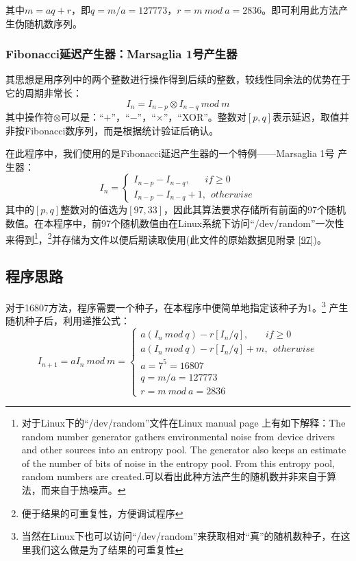 \documentclass[a4paper,11pt]{article}
\begin{document}
其中$m=aq+r$，即$q=m/a=127773$，$r=m \ mod \ a=2836$。即可利用此方法产生伪随机数序列。

\subsubsection{Fibonacci延迟产生器：Marsaglia 1号产生器}
其思想是用序列中的两个整数进行操作得到后续的整数，较线性同余法的优势在于它的周期非常长：
\begin{equation}
	I_{n}=I_{n-p} \otimes I_{n-q} \ mod \  m
\end{equation}
其中操作符$\otimes$可以是：“$+$”，“$-$”，“$\times$”，“XOR”。整数对$[p,q]$表示延迟，取值并非按Fibonacci数序列，而是根据统计验证后确认。

在此程序中，我们使用的是Fibonacci延迟产生器的一个特例——Marsaglia 1号 产生器：
\begin{equation}
	I_{n}=\left\{
	\begin{array}{l}
		I_{n-p} - I_{n-q},  \ \ \ \ \ \ \ if \geq 0 \\
		I_{n-p} - I_{n-q}+1, \ \ otherwise
	\end{array}
	\right.
\end{equation}
其中的$[p,q]$整数对的值选为$[97,33]$，因此其算法要求存储所有前面的97个随机数值。在本程序中，前97个随机数值由在Linux系统下访问“/dev/random”一次性来得到\footnote{对于Linux下的“/dev/random”文件在Linux manual page 上有如下解释：The random number generator gathers environmental noise from device
       drivers and other sources into an entropy pool.  The generator also
       keeps an estimate of the number of bits of noise in the entropy pool.
       From this entropy pool, random numbers are created.可以看出此种方法产生的随机数并非来自于算法，而来自于热噪声。}，\footnote{便于结果的可重复性，方便调试程序}并存储为文件以便后期读取使用(此文件的原始数据见附录 \ref{97})。

\subsection{程序思路}
对于16807方法，程序需要一个种子，在本程序中便简单地指定该种子为1。\footnote{当然在Linux下也可以访问“/dev/random”来获取相对“真”的随机数种子，在这里我们这么做是为了结果的可重复性}
产生随机种子后，利用递推公式：
\begin{equation}
	I_{n+1} = aI_{n}  \ mod \ m = \left\{
	\begin{array}{l}
	a(I_{n}\ mod \ q) - r[I_{n}/q],\ \ \ \ \ \ \ \ if \geq 0 \\
		a(I_{n}\ mod \ q) - r[I_{n}/q] + m,\ \ otherwise	 \\
		a= 7^{5} =16807 \\
		q=m/a=127773\\
		r=m \ mod \ a=2836
	\end{array} 
	\right.
\end{equation}
\end{document}
